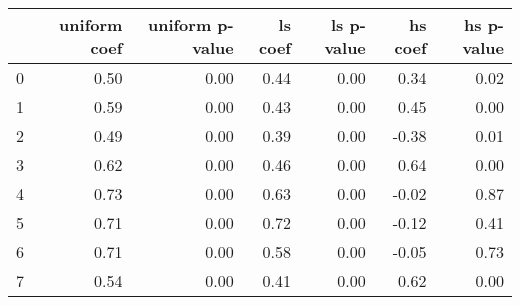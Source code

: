 \begin{tabular}{lrrrrrr}
\toprule
 & uniform coef & uniform p-value & ls coef & ls p-value & hs coef & hs p-value \\
\midrule
0 & 0.50 & 0.00 & 0.44 & 0.00 & 0.34 & 0.02 \\
1 & 0.59 & 0.00 & 0.43 & 0.00 & 0.45 & 0.00 \\
2 & 0.49 & 0.00 & 0.39 & 0.00 & -0.38 & 0.01 \\
3 & 0.62 & 0.00 & 0.46 & 0.00 & 0.64 & 0.00 \\
4 & 0.73 & 0.00 & 0.63 & 0.00 & -0.02 & 0.87 \\
5 & 0.71 & 0.00 & 0.72 & 0.00 & -0.12 & 0.41 \\
6 & 0.71 & 0.00 & 0.58 & 0.00 & -0.05 & 0.73 \\
7 & 0.54 & 0.00 & 0.41 & 0.00 & 0.62 & 0.00 \\
\bottomrule
\end{tabular}
